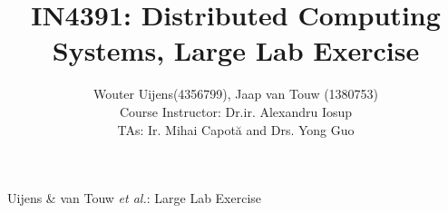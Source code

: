 \documentclass[12pt,journal, compsoc]{IEEEtran}
\begin{document}
\title{IN4391: Distributed Computing Systems, Large Lab Exercise}

\author{Wouter Uijens(4356799), Jaap van Touw (1380753) \\Course Instructor: Dr.ir. Alexandru Iosup\\ TAs: Ir. Mihai Capot\u{a}  and Drs. Yong Guo\\ }

{Uijens \& van Touw \MakeLowercase{\textit{et al.}}:  Large Lab Exercise}

\IEEEtitleabstractindextext{

}

\maketitle
\IEEEdisplaynontitleabstractindextext
\IEEEpeerreviewmaketitle
\nocite{*}
	
			
					
			
			




\appendix


\end{document}
